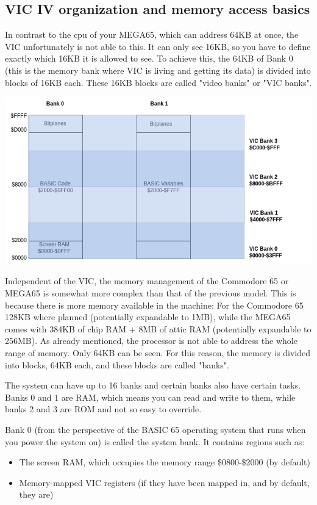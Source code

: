 \subsection*{VIC IV organization and memory access basics}

In contrast to the cpu of your MEGA65, which can address 64KB at once, the VIC unfortunately is not able to this. It can only see 16KB, so you have to define exactly which 16KB it is allowed to see. To achieve this, the 64KB of Bank 0 (this is the memory bank where VIC is living and getting its data) is divided into blocks of 16KB each. These 16KB blocks are called "video banks" or "VIC banks".

\includegraphics[width=\linewidth]{images/graphics/vic-banks.png}

Independent of the VIC, the memory management of the Commodore 65 or MEGA65 is somewhat more complex than that of the previous model. This is because there is more memory available in the machine: For the Commodore 65 128KB where planned (potentially expandable to 1MB), while the MEGA65 comes with 384KB of chip RAM + 8MB of attic RAM (potentially expandable to 256MB). As already mentioned, the processor is not able to address the whole range of memory. Only 64KB can be seen. For this reason, the memory is divided into blocks, 64KB each, and these blocks are called "banks".

The system can have up to 16 banks and certain banks also have certain tasks. Banks 0 and 1 are RAM, which means you can read and write to them, while banks 2 and 3 are ROM and not so easy to override.

Bank 0 (from the perspective of the BASIC 65 operating system that runs when you power the system on) is called the system bank. It contains regions such as:

\begin{itemize}
  \item The screen RAM, which occupies the memory range \$0800-\$2000 (by default)
  \item Memory-mapped VIC registers (if they have been mapped in, and by default, they are)
\end{itemize}

